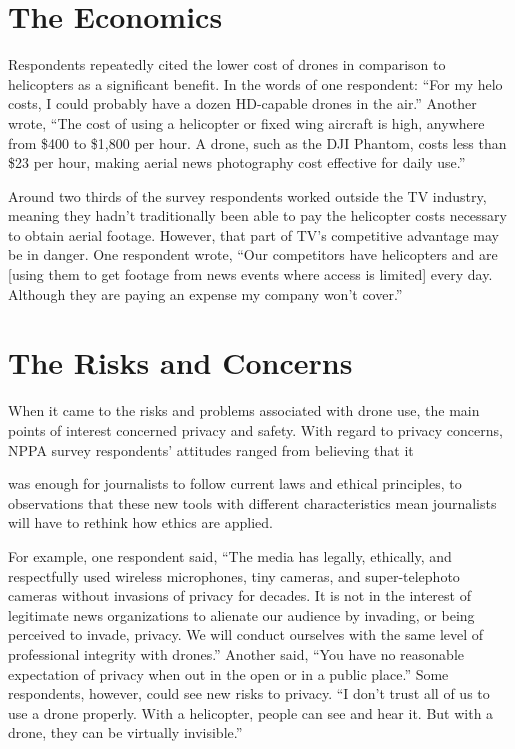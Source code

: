 \section{The Economics}
Respondents repeatedly cited the lower cost of drones in comparison to
helicopters as a significant benefit. In the words of one respondent: ``For
my helo costs, I could probably have a dozen HD-capable drones in the air.''
Another wrote, ``The cost of using a helicopter or fixed wing aircraft is high,
anywhere from \$400 to \$1,800 per hour. A drone, such as the DJI Phantom,
costs less than \$23 per hour, making aerial news photography cost effective
for daily use.''

Around two thirds of the survey respondents worked outside the TV industry,
meaning they hadn't traditionally been able to pay the helicopter costs
necessary to obtain aerial footage. However, that part of TV's competitive
advantage may be in danger. One respondent wrote, ``Our competitors have
helicopters and are [using them to get footage from news events where
access is limited] every day. Although they are paying an expense my company
won't cover.''

\section{The Risks and Concerns}
When it came to the risks and problems associated with drone use, the
main points of interest concerned privacy and safety. With regard to privacy
concerns, NPPA survey respondents' attitudes ranged from believing that it

was enough for journalists to follow current laws and ethical principles, to
observations that these new tools with different characteristics mean journalists
will have to rethink how ethics are applied.

For example, one respondent said, ``The media has legally, ethically, and
respectfully used wireless microphones, tiny cameras, and super-telephoto
cameras without invasions of privacy for decades. It is not in the interest of
legitimate news organizations to alienate our audience by invading, or being
perceived to invade, privacy. We will conduct ourselves with the same level
of professional integrity with drones.'' Another said, ``You have no reasonable
expectation of privacy when out in the open or in a public place.'' Some
respondents, however, could see new risks to privacy. ``I don't trust all of us
to use a drone properly. With a helicopter, people can see and hear it. But
with a drone, they can be virtually invisible.''

